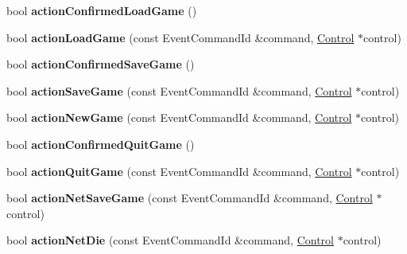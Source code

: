 \begin{DoxyCompactItemize}
\item 
bool {\bfseries action\+Confirmed\+Load\+Game} ()\hypertarget{classBaseComputer_a59e5bbe4c5078698c14c1f96dcc81b0a}{}\label{classBaseComputer_a59e5bbe4c5078698c14c1f96dcc81b0a}

\item 
bool {\bfseries action\+Load\+Game} (const Event\+Command\+Id \&command, \hyperlink{classControl}{Control} $\ast$control)\hypertarget{classBaseComputer_a2d4c1d252006c7bf952d6e925c092416}{}\label{classBaseComputer_a2d4c1d252006c7bf952d6e925c092416}

\item 
bool {\bfseries action\+Confirmed\+Save\+Game} ()\hypertarget{classBaseComputer_ab9ccc33edc6592ce03daf1821902d27f}{}\label{classBaseComputer_ab9ccc33edc6592ce03daf1821902d27f}

\item 
bool {\bfseries action\+Save\+Game} (const Event\+Command\+Id \&command, \hyperlink{classControl}{Control} $\ast$control)\hypertarget{classBaseComputer_accc295ba41aea6e10a3593917040e9be}{}\label{classBaseComputer_accc295ba41aea6e10a3593917040e9be}

\item 
bool {\bfseries action\+New\+Game} (const Event\+Command\+Id \&command, \hyperlink{classControl}{Control} $\ast$control)\hypertarget{classBaseComputer_acd69dbc42a6252b83abb9b7dfcaf122a}{}\label{classBaseComputer_acd69dbc42a6252b83abb9b7dfcaf122a}

\item 
bool {\bfseries action\+Confirmed\+Quit\+Game} ()\hypertarget{classBaseComputer_aeb25eb7f477787c6c64480be32fd2287}{}\label{classBaseComputer_aeb25eb7f477787c6c64480be32fd2287}

\item 
bool {\bfseries action\+Quit\+Game} (const Event\+Command\+Id \&command, \hyperlink{classControl}{Control} $\ast$control)\hypertarget{classBaseComputer_a20b70c6e2eda424758b7a7856489ad2d}{}\label{classBaseComputer_a20b70c6e2eda424758b7a7856489ad2d}

\item 
bool {\bfseries action\+Net\+Save\+Game} (const Event\+Command\+Id \&command, \hyperlink{classControl}{Control} $\ast$control)\hypertarget{classBaseComputer_a9b5845bea7c544a129fb527b4a592666}{}\label{classBaseComputer_a9b5845bea7c544a129fb527b4a592666}

\item 
bool {\bfseries action\+Net\+Die} (const Event\+Command\+Id \&command, \hyperlink{classControl}{Control} $\ast$control)\hypertarget{classBaseComputer_a693ece38704367916902e933cd0f9a9a}{}\label{classBaseComputer_a693ece38704367916902e933cd0f9a9a}


\end{DoxyCompactItemize}
